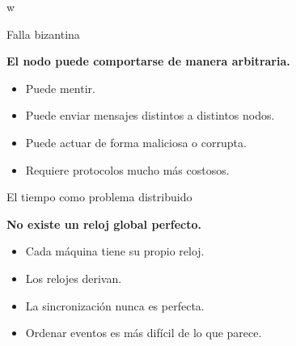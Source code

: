 w\documentclass[aspectratio=169]{beamer}
\begin{document}
\begin{frame}{Falla bizantina}

\Large

\begin{center}
\textbf{El nodo puede comportarse de manera arbitraria.}
\end{center}

\vspace{0.7cm}

\normalsize

\begin{itemize}
    \item Puede mentir.
    \item Puede enviar mensajes distintos a distintos nodos.
    \item Puede actuar de forma maliciosa o corrupta.
    \item Requiere protocolos mucho más costosos.
\end{itemize}

\end{frame}

\begin{frame}{El tiempo como problema distribuido}

\Large

\begin{center}
\textbf{No existe un reloj global perfecto.}
\end{center}

\vspace{0.7cm}

\normalsize

\begin{itemize}
    \item Cada máquina tiene su propio reloj.
    \item Los relojes derivan.
    \item La sincronización nunca es perfecta.
    \item Ordenar eventos es más difícil de lo que parece.
\end{itemize}

\end{frame}
\end{document}
